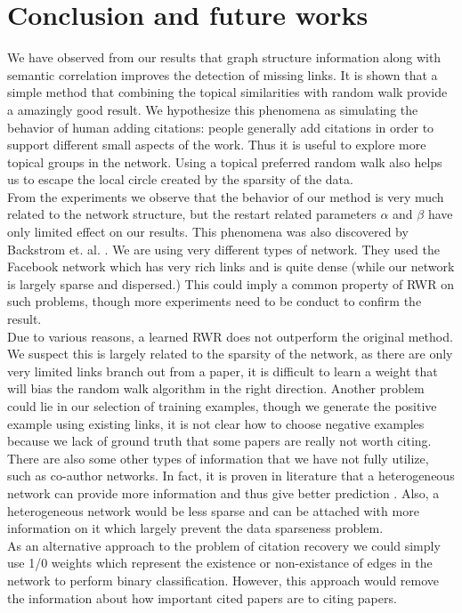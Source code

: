 \documentclass{article} %
\begin{document}
\section{Conclusion and future works}
We have observed from our results that graph structure information along with semantic correlation improves the detection of missing links.  It is shown that a simple method that combining the topical similarities with random walk provide a amazingly good result. We hypothesize this phenomena as simulating the behavior of human adding citations: people generally add citations in order to support different small aspects of the work. Thus it is useful to explore more topical groups in the network. Using a topical preferred random walk also helps us to escape the local circle created by the sparsity of the data.\\
From the experiments we observe that the behavior of our method is very much related to the network structure, but the restart related parameters $\alpha$ and $\beta$ have only limited effect on our results. This phenomena was also discovered by Backstrom et. al. \cite{Backstrom:2011:SRW:1935826.1935914}. We are using very different types of network. They used the Facebook network which has very rich links and is quite dense (while our network is largely sparse and dispersed.) This could imply a common property of RWR on such problems, though more experiments need to be conduct to confirm the result. \\
Due to various reasons, a learned RWR does not outperform the original method. We suspect this is largely related to the sparsity of the network, as there are only very limited links branch out from a paper, it is difficult to learn a weight that will bias the random walk algorithm in the right direction. Another problem could lie in our selection of training examples, though we generate the positive example using existing links, it is not clear how to choose negative examples because we lack of ground truth that some papers are really not worth citing.\\ 
There are also some other types of information that we have not fully utilize, such as co-author networks. In fact, it is proven in literature that a heterogeneous network can provide more information and thus give better prediction \cite{Lao2010,Yu2012}. Also, a heterogeneous network would be less sparse and can be attached with more information on it which largely prevent the data sparseness problem.\\
As an alternative approach to the problem of citation recovery we could simply use 1/0 weights which represent the existence or non-existance of edges in the network to perform binary classification. However, this approach would remove the information about how important cited papers are to citing papers.

\newpage


\nocite{*}
\end{document}

